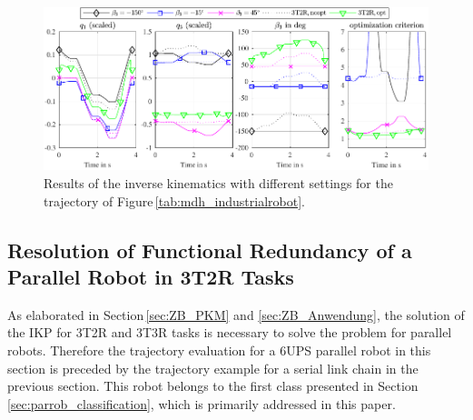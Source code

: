 \documentclass[robotics,article,accept,moreauthors,pdftex]{Definitions/mdpi}
\begin{document}
\begin{figure}[H]
    \includegraphics{serrob_traj_nullspace_optim.pdf}
    \caption{Results of the inverse kinematics with different settings for the trajectory of Figure\,\ref{tab:mdh_industrialrobot}.}
    \label{fig:serrob_traj_3T2R}
\end{figure}

\subsection{Resolution of Functional Redundancy of a Parallel Robot in 3T2R Tasks}
\label{sec:Ergebnisse_IK_Parallel}


As elaborated in Section\,\ref{sec:ZB_PKM} and \ref{sec:ZB_Anwendung}, the solution of the IKP for 3T2R and 3T3R tasks is necessary to solve the problem for parallel robots.
Therefore\added[id=Sp]{,} the trajectory evaluation for a 6UPS parallel robot
in this section is preceded by the trajectory example for a serial link chain in the previous section.
This robot belongs to the first class presented in Section\,\ref{sec:parrob_classification}, which is primarily addressed in this paper.
\end{document}

